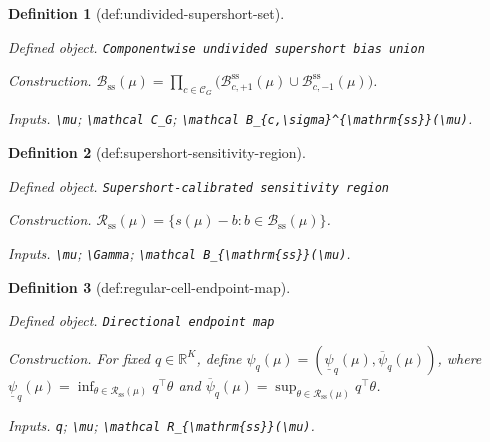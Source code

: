 \documentclass{article}
\newtheorem{definition}{Definition}
\begin{document}
\begin{definition}[def:undivided-supershort-set]\label{def:undivided-supershort-set}
\par\smallskip\noindent\emph{Defined object.} \texttt{Componentwise undivided supershort bias union}
\par\smallskip\noindent\emph{Construction.} \(\mathcal B_{\mathrm{ss}}(\mu)=\prod_{c\in\mathcal C_G}\bigl(\mathcal B_{c,+1}^{\mathrm{ss}}(\mu)\cup\mathcal B_{c,-1}^{\mathrm{ss}}(\mu)\bigr)\).
\par\smallskip\noindent\emph{Inputs.} \texttt{\textbackslash{}\allowbreak{}mu}; \texttt{\textbackslash{}\allowbreak{}mathcal C\_\allowbreak{}G}; \texttt{\textbackslash{}\allowbreak{}mathcal B\_\allowbreak{}\{c,\allowbreak{}\textbackslash{}\allowbreak{}sigma\}\allowbreak{}\textasciicircum{}\{\textbackslash{}\allowbreak{}mathrm\{ss\}\allowbreak{}\}\allowbreak{}(\textbackslash{}\allowbreak{}mu)}.
\end{definition}

\begin{definition}[def:supershort-sensitivity-region]\label{def:supershort-sensitivity-region}
\par\smallskip\noindent\emph{Defined object.} \texttt{Supershort-\allowbreak{}calibrated sensitivity region}
\par\smallskip\noindent\emph{Construction.} \(\mathcal R_{\mathrm{ss}}(\mu)=\{s(\mu)-b:b\in\mathcal B_{\mathrm{ss}}(\mu)\}\).
\par\smallskip\noindent\emph{Inputs.} \texttt{\textbackslash{}\allowbreak{}mu}; \texttt{\textbackslash{}\allowbreak{}Gamma}; \texttt{\textbackslash{}\allowbreak{}mathcal B\_\allowbreak{}\{\textbackslash{}\allowbreak{}mathrm\{ss\}\allowbreak{}\}\allowbreak{}(\textbackslash{}\allowbreak{}mu)}.
\end{definition}

\begin{definition}[def:regular-cell-endpoint-map]\label{def:regular-cell-endpoint-map}
\par\smallskip\noindent\emph{Defined object.} \texttt{Directional endpoint map}
\par\smallskip\noindent\emph{Construction.} For fixed \(q\in\mathbb R^K\), define \(\psi_q(\mu)=(\underline\psi_q(\mu),\overline\psi_q(\mu))\), where \(\underline\psi_q(\mu)=\inf_{\theta\in\mathcal R_{\mathrm{ss}}(\mu)}q^\top\theta\) and \(\overline\psi_q(\mu)=\sup_{\theta\in\mathcal R_{\mathrm{ss}}(\mu)}q^\top\theta\).
\par\smallskip\noindent\emph{Inputs.} \texttt{q}; \texttt{\textbackslash{}\allowbreak{}mu}; \texttt{\textbackslash{}\allowbreak{}mathcal R\_\allowbreak{}\{\textbackslash{}\allowbreak{}mathrm\{ss\}\allowbreak{}\}\allowbreak{}(\textbackslash{}\allowbreak{}mu)}.
\end{definition}
\end{document}
